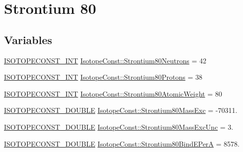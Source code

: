 \hypertarget{group___isotope_const-_strontium-_sr80}{}\section{Strontium 80}
\label{group___isotope_const-_strontium-_sr80}
\subsection*{Variables}
\begin{DoxyCompactItemize}
\item 
\mbox{\hyperlink{group___isotope_const-_macros_ga5f18360b3e99483a35c32d789e62621c}{I\+S\+O\+T\+O\+P\+E\+C\+O\+N\+S\+T\+\_\+\+I\+NT}} \mbox{\hyperlink{group___isotope_const-_strontium-_sr80_gafd4ee76666c61ec1f88913bdc197d055}{Isotope\+Const\+::\+Strontium80\+Neutrons}} = 42
\item 
\mbox{\hyperlink{group___isotope_const-_macros_ga5f18360b3e99483a35c32d789e62621c}{I\+S\+O\+T\+O\+P\+E\+C\+O\+N\+S\+T\+\_\+\+I\+NT}} \mbox{\hyperlink{group___isotope_const-_strontium-_sr80_gafbab7693491cfd91975edc6b22b339ba}{Isotope\+Const\+::\+Strontium80\+Protons}} = 38
\item 
\mbox{\hyperlink{group___isotope_const-_macros_ga5f18360b3e99483a35c32d789e62621c}{I\+S\+O\+T\+O\+P\+E\+C\+O\+N\+S\+T\+\_\+\+I\+NT}} \mbox{\hyperlink{group___isotope_const-_strontium-_sr80_ga487254f31f4c55f42d5306b069ce0083}{Isotope\+Const\+::\+Strontium80\+Atomic\+Weight}} = 80
\item 
\mbox{\hyperlink{group___isotope_const-_macros_ga8f45a7272ce02c0b4c65c44636ed719a}{I\+S\+O\+T\+O\+P\+E\+C\+O\+N\+S\+T\+\_\+\+D\+O\+U\+B\+LE}} \mbox{\hyperlink{group___isotope_const-_strontium-_sr80_gab85495c95eac79a28a50bebbb01932cc}{Isotope\+Const\+::\+Strontium80\+Mass\+Exc}} = -\/70311.
\item 
\mbox{\hyperlink{group___isotope_const-_macros_ga8f45a7272ce02c0b4c65c44636ed719a}{I\+S\+O\+T\+O\+P\+E\+C\+O\+N\+S\+T\+\_\+\+D\+O\+U\+B\+LE}} \mbox{\hyperlink{group___isotope_const-_strontium-_sr80_gae6a358eed5085cb11879a9157dbc51a0}{Isotope\+Const\+::\+Strontium80\+Mass\+Exc\+Unc}} = 3.
\item 
\mbox{\hyperlink{group___isotope_const-_macros_ga8f45a7272ce02c0b4c65c44636ed719a}{I\+S\+O\+T\+O\+P\+E\+C\+O\+N\+S\+T\+\_\+\+D\+O\+U\+B\+LE}} \mbox{\hyperlink{group___isotope_const-_strontium-_sr80_ga48e879f271b12006bb75e049b74552ff}{Isotope\+Const\+::\+Strontium80\+Bind\+E\+PerA}} = 8578.
\item 

\end{DoxyCompactItemize}
